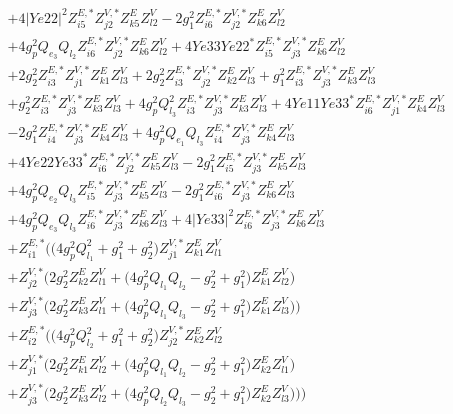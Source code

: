 \begin{align}
 &+4 |Ye22|^2 Z^{E,*}_{i 5} Z^{V,*}_{j 2} Z_{{k 5}}^{E} Z_{{l 2}}^{V} -2 g_{1}^{2} Z^{E,*}_{i 6} Z^{V,*}_{j 2} Z_{{k 6}}^{E} Z_{{l 2}}^{V} \nonumber \\ 
 &+4 g_{p}^{2} Q_{e_3} Q_{l_2} Z^{E,*}_{i 6} Z^{V,*}_{j 2} Z_{{k 6}}^{E} Z_{{l 2}}^{V} +4 Ye33 Ye22^* Z^{E,*}_{i 5} Z^{V,*}_{j 3} Z_{{k 6}}^{E} Z_{{l 2}}^{V} \nonumber \\ 
 &+2 g_{2}^{2} Z^{E,*}_{i 3} Z^{V,*}_{j 1} Z_{{k 1}}^{E} Z_{{l 3}}^{V} +2 g_{2}^{2} Z^{E,*}_{i 3} Z^{V,*}_{j 2} Z_{{k 2}}^{E} Z_{{l 3}}^{V} +g_{1}^{2} Z^{E,*}_{i 3} Z^{V,*}_{j 3} Z_{{k 3}}^{E} Z_{{l 3}}^{V} \nonumber \\ 
 &+g_{2}^{2} Z^{E,*}_{i 3} Z^{V,*}_{j 3} Z_{{k 3}}^{E} Z_{{l 3}}^{V} +4 g_{p}^{2} Q_{l_3}^{2} Z^{E,*}_{i 3} Z^{V,*}_{j 3} Z_{{k 3}}^{E} Z_{{l 3}}^{V} +4 Ye11 Ye33^* Z^{E,*}_{i 6} Z^{V,*}_{j 1} Z_{{k 4}}^{E} Z_{{l 3}}^{V} \nonumber \\ 
 &-2 g_{1}^{2} Z^{E,*}_{i 4} Z^{V,*}_{j 3} Z_{{k 4}}^{E} Z_{{l 3}}^{V} +4 g_{p}^{2} Q_{e_{1}} Q_{l_3} Z^{E,*}_{i 4} Z^{V,*}_{j 3} Z_{{k 4}}^{E} Z_{{l 3}}^{V} \nonumber \\ 
 &+4 Ye22 Ye33^* Z^{E,*}_{i 6} Z^{V,*}_{j 2} Z_{{k 5}}^{E} Z_{{l 3}}^{V} -2 g_{1}^{2} Z^{E,*}_{i 5} Z^{V,*}_{j 3} Z_{{k 5}}^{E} Z_{{l 3}}^{V} \nonumber \\ 
 &+4 g_{p}^{2} Q_{e_{2}} Q_{l_3} Z^{E,*}_{i 5} Z^{V,*}_{j 3} Z_{{k 5}}^{E} Z_{{l 3}}^{V} -2 g_{1}^{2} Z^{E,*}_{i 6} Z^{V,*}_{j 3} Z_{{k 6}}^{E} Z_{{l 3}}^{V} \nonumber \\ 
 &+4 g_{p}^{2} Q_{e_3} Q_{l_3} Z^{E,*}_{i 6} Z^{V,*}_{j 3} Z_{{k 6}}^{E} Z_{{l 3}}^{V} +4 |Ye33|^2 Z^{E,*}_{i 6} Z^{V,*}_{j 3} Z_{{k 6}}^{E} Z_{{l 3}}^{V} \nonumber \\ 
 &+Z^{E,*}_{i 1} \Big(\Big(4 g_{p}^{2} Q_{l_1}^{2}  + g_{1}^{2} + g_{2}^{2}\Big)Z^{V,*}_{j 1} Z_{{k 1}}^{E} Z_{{l 1}}^{V} \nonumber \\ 
 &+Z^{V,*}_{j 2} \Big(2 g_{2}^{2} Z_{{k 2}}^{E} Z_{{l 1}}^{V}  + \Big(4 g_{p}^{2} Q_{l_1} Q_{l_2}  - g_{2}^{2}  + g_{1}^{2}\Big)Z_{{k 1}}^{E} Z_{{l 2}}^{V} \Big)\nonumber \\ 
 &+Z^{V,*}_{j 3} \Big(2 g_{2}^{2} Z_{{k 3}}^{E} Z_{{l 1}}^{V}  + \Big(4 g_{p}^{2} Q_{l_1} Q_{l_3}  - g_{2}^{2}  + g_{1}^{2}\Big)Z_{{k 1}}^{E} Z_{{l 3}}^{V} \Big)\Big)\nonumber \\ 
 &+Z^{E,*}_{i 2} \Big(\Big(4 g_{p}^{2} Q_{l_2}^{2}  + g_{1}^{2} + g_{2}^{2}\Big)Z^{V,*}_{j 2} Z_{{k 2}}^{E} Z_{{l 2}}^{V} \nonumber \\ 
 &+Z^{V,*}_{j 1} \Big(2 g_{2}^{2} Z_{{k 1}}^{E} Z_{{l 2}}^{V}  + \Big(4 g_{p}^{2} Q_{l_1} Q_{l_2}  - g_{2}^{2}  + g_{1}^{2}\Big)Z_{{k 2}}^{E} Z_{{l 1}}^{V} \Big)\nonumber \\ 
 &+Z^{V,*}_{j 3} \Big(2 g_{2}^{2} Z_{{k 3}}^{E} Z_{{l 2}}^{V}  + \Big(4 g_{p}^{2} Q_{l_2} Q_{l_3}  - g_{2}^{2}  + g_{1}^{2}\Big)Z_{{k 2}}^{E} Z_{{l 3}}^{V} \Big)\Big)\Big)\end{align} 
